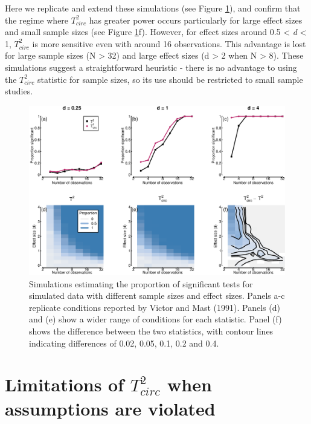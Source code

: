 \documentclass[]{article}
\begin{document}
Here we replicate and extend these simulations (see Figure \ref{fig:powerfig}), and confirm that the regime where \(T^2_{circ}\) has greater power occurs particularly for large effect sizes and small sample sizes (see Figure \ref{fig:powerfig}f). However, for effect sizes around 0.5 \textless{} \emph{d} \textless{} 1, \(T^2_{circ}\) is more sensitive even with around 16 observations. This advantage is lost for large sample sizes (N \textgreater{} 32) and large effect sizes (d \textgreater{} 2 when N \textgreater{} 8). These simulations suggest a straightforward heuristic - there is no advantage to using the \(T^2_{circ}\) statistic for sample sizes, so its use should be restricted to small sample studies.

\begin{figure}

{\centering \includegraphics{manuscript_files/figure-latex/powerfig-1} 

}

\caption{Simulations estimating the proportion of significant tests for simulated data with different sample sizes and effect sizes. Panels a-c replicate conditions reported by Victor and Mast (1991). Panels (d) and (e) show a wider range of conditions for each statistic. Panel (f) shows the difference between the two statistics, with contour lines indicating differences of 0.02, 0.05, 0.1, 0.2 and 0.4.}\label{fig:powerfig}
\end{figure}

\hypertarget{limitations-of-t2_circ-when-assumptions-are-violated}{%
\section{\texorpdfstring{Limitations of \(T^2_{circ}\) when assumptions are violated}{Limitations of T\^{}2\_\{circ\} when assumptions are violated}}\label{limitations-of-t2_circ-when-assumptions-are-violated}}
\end{document}
